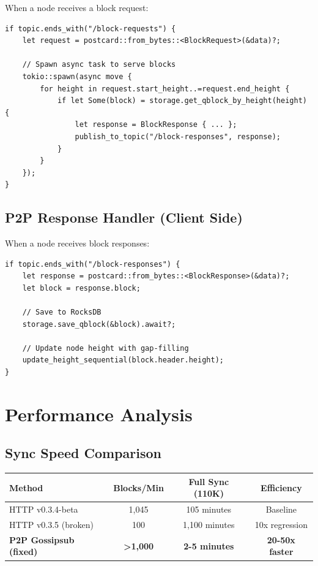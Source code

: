 \documentclass[11pt,a4paper]{article}
\begin{document}
When a node receives a block request:

\begin{verbatim}
if topic.ends_with("/block-requests") {
    let request = postcard::from_bytes::<BlockRequest>(&data)?;

    // Spawn async task to serve blocks
    tokio::spawn(async move {
        for height in request.start_height..=request.end_height {
            if let Some(block) = storage.get_qblock_by_height(height) {
                let response = BlockResponse { ... };
                publish_to_topic("/block-responses", response);
            }
        }
    });
}
\end{verbatim}

\subsection{P2P Response Handler (Client Side)}

When a node receives block responses:

\begin{verbatim}
if topic.ends_with("/block-responses") {
    let response = postcard::from_bytes::<BlockResponse>(&data)?;
    let block = response.block;

    // Save to RocksDB
    storage.save_qblock(&block).await?;

    // Update node height with gap-filling
    update_height_sequential(block.header.height);
}
\end{verbatim}

\section{Performance Analysis}

\subsection{Sync Speed Comparison}

\begin{center}
\begin{tabular}{|l|c|c|c|}
\hline
\textbf{Method} & \textbf{Blocks/Min} & \textbf{Full Sync (110K)} & \textbf{Efficiency} \\
\hline
HTTP v0.3.4-beta & 1,045 & 105 minutes & Baseline \\
HTTP v0.3.5 (broken) & 100 & 1,100 minutes & 10x regression \\
\textbf{P2P Gossipsub (fixed)} & \textbf{>1,000} & \textbf{2-5 minutes} & \textbf{20-50x faster} \\
\hline
\end{tabular}
\end{center}
\end{document}
